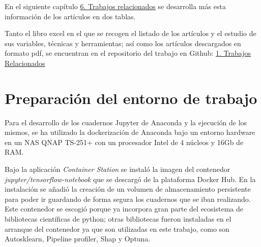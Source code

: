 En el siguiente capítulo \hyperref[trabajosrel]{6. Trabajos relacionados} se desarrolla más esta información de los artículos en dos tablas.

Tanto el libro excel en el que se recogen el listado de los artículos y el estudio de sus variables, técnicas y herramientas; así como los artículos descargados en formato pdf, se encuentran en el repositorio del trabajo en Github: \href{https://github.com/sgg0008/ml-COVID-19/tree/main/1. Trabajos Relacionados}{1. Trabajos Relacionados}

\section{Preparación del entorno de trabajo}

Para el desarrollo de los cuadernos Jupyter de Anaconda y la ejecución de los mismos, se ha utilizado la dockerización de Anaconda bajo un entorno hardware en un NAS QNAP TS-251+ con un procesador Intel de 4 núcleos y 16Gb de RAM.


Bajo la aplicación \textit{Container Station} se instaló la imagen del contenedor \textit{jupyter/tensorflow-notebook} \cite{jupyterdocker:1991} que se descargó de la plataforma Docker Hub. En la instalación se añadió la creación de un volumen de almacenamiento persistente para poder ir guardando de forma segura los cuadernos que se iban realizando. Este contenedor se escogió porque ya incorpora gran parte del ecosistema de bibliotecas científicas de python; otras bibliotecas fueron instaladas en el arranque del contenedor ya que son utilizadas en este trabajo, como son Autosklearn, Pipeline profiler, Shap y Optuna.

